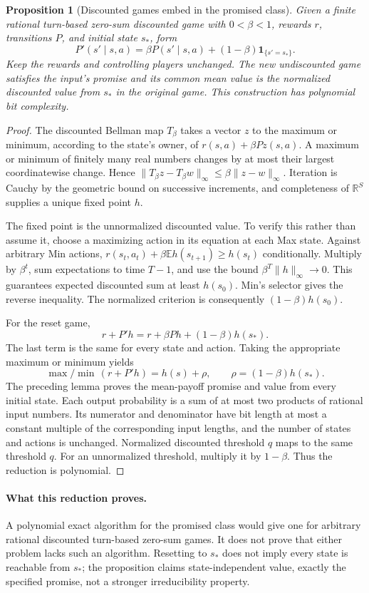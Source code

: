 \documentclass[11pt,a4paper]{article}
\newtheorem{proposition}[theorem]{Proposition}
\theoremstyle{definition}
\theoremstyle{remark}
\begin{document}
\begin{proposition}[Discounted games embed in the promised class]
Given a finite rational turn-based zero-sum discounted game with $0<\beta<1$, rewards $r$, transitions $P$, and initial state $s_*$, form
\[
 P'(s'\mid s,a)=\beta P(s'\mid s,a)+(1-\beta)\mathbf1_{\{s'=s_*\}}.
\]
Keep the rewards and controlling players unchanged. The new undiscounted game satisfies the input's promise and its common mean value is the normalized discounted value from $s_*$ in the original game. This construction has polynomial bit complexity.
\end{proposition}
\begin{proof}
The discounted Bellman map $T_\beta$ takes a vector $z$ to the maximum or minimum, according to the state's owner, of $r(s,a)+\beta Pz(s,a)$. A maximum or minimum of finitely many real numbers changes by at most their largest coordinatewise change. Hence $\|T_\beta z-T_\beta w\|_\infty\leq\beta\|z-w\|_\infty$. Iteration is Cauchy by the geometric bound on successive increments, and completeness of $\mathbb R^S$ supplies a unique fixed point $h$.

The fixed point is the unnormalized discounted value. To verify this rather than assume it, choose a maximizing action in its equation at each Max state. Against arbitrary Min actions,
$r(s_t,a_t)+\beta\mathbb E h(s_{t+1})\geq h(s_t)$ conditionally. Multiply by $\beta^t$, sum expectations to time $T-1$, and use the bound $\beta^T\|h\|_\infty\to0$. This guarantees expected discounted sum at least $h(s_0)$. Min's selector gives the reverse inequality. The normalized criterion is consequently $(1-\beta)h(s_0)$.

For the reset game,
\[
 r+P'h=r+\beta Ph+(1-\beta)h(s_*).
\]
The last term is the same for every state and action. Taking the appropriate maximum or minimum yields
\[
 \max/\min\,(r+P'h)=h(s)+\rho,
 \qquad \rho=(1-\beta)h(s_*).
\]
The preceding lemma proves the mean-payoff promise and value from every initial state. Each output probability is a sum of at most two products of rational input numbers. Its numerator and denominator have bit length at most a constant multiple of the corresponding input lengths, and the number of states and actions is unchanged. Normalized discounted threshold $q$ maps to the same threshold $q$. For an unnormalized threshold, multiply it by $1-\beta$. Thus the reduction is polynomial.
\end{proof}

\paragraph{What this reduction proves.}
A polynomial exact algorithm for the promised class would give one for arbitrary rational discounted turn-based zero-sum games. It does not prove that either problem lacks such an algorithm. Resetting to $s_*$ does not imply every state is reachable from $s_*$; the proposition claims state-independent value, exactly the specified promise, not a stronger irreducibility property.
\end{document}
